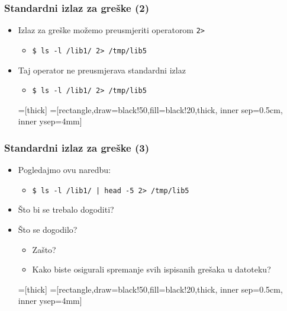 \documentclass{beamer}
\newcommand{\shell}[1]{\texttt{#1}}
\begin{document}
\begin{frame}[t]
\frametitle{Standardni izlaz za greške (2)}
\begin{itemize}
  \item Izlaz za greške možemo preusmjeriti operatorom \shell{2>}
  \begin{itemize}
    \item[] \shell{\$ ls -l /lib1/ 2> /tmp/lib5}
  \end{itemize}
  \item Taj operator ne preusmjerava standardni izlaz
  \begin{itemize}
    \item[] \shell{\$ ls -l /lib1/ 2> /tmp/lib5}
  \end{itemize}
  \vspace{1cm}
  =[thick]
  =[rectangle,draw=black!50,fill=black!20,thick,
                     inner sep=0.5cm, inner ysep=4mm]
\end{itemize}
\end{frame}

\begin{frame}[t]
\frametitle{Standardni izlaz za greške (3)}
\begin{itemize}%
  \item Pogledajmo ovu naredbu:
  \begin{itemize}
    \item[] \shell{\$ ls -l /lib1/ | head -5 2> /tmp/lib5}
  \end{itemize}
  \item Što bi se trebalo dogoditi?
  \item Što se dogodilo?
  \begin{itemize}
    \item Zašto?
    \item Kako biste osigurali spremanje svih ispisanih grešaka u datoteku?
  \end{itemize}
  \vspace{1cm}
  =[thick]
  =[rectangle,draw=black!50,fill=black!20,thick,
  inner sep=0.5cm, inner ysep=4mm]
\end{itemize}
\end{frame}
\end{document}
